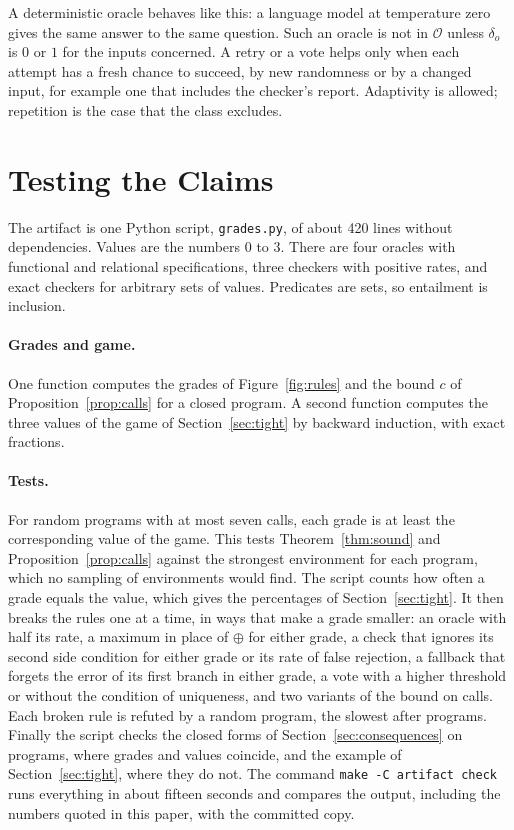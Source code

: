\documentclass[acmsmall,nonacm,screen]{acmart}
\newcommand{\cO}{\mathcal{O}}
\begin{document}
A deterministic oracle behaves like this: a language model at temperature zero gives the
same answer to the same question. Such an oracle is not in $\cO$ unless $\delta_o$ is $0$ or
$1$ for the inputs concerned. A retry or a vote helps only when each attempt has a fresh
chance to succeed, by new randomness or by a changed input, for example one that includes
the checker's report. Adaptivity is allowed; repetition is the case that the class excludes.

\section{Testing the Claims}
\label{sec:tests}

The artifact is one Python script, \texttt{grades.py}, of about 420 lines without
dependencies. Values are the numbers $0$ to $3$. There are four oracles with functional and
relational specifications, three checkers with positive rates, and exact checkers for
arbitrary sets of values. Predicates are sets, so entailment is inclusion.

\paragraph{Grades and game.} One function computes the grades of Figure~\ref{fig:rules} and
the bound $c$ of Proposition~\ref{prop:calls} for a closed program. A second function computes
the three values of the game of Section~\ref{sec:tight} by backward induction, with exact
fractions.

\paragraph{Tests.} For \exPrograms{} random programs with at most seven calls, each grade is
at least the corresponding value of the game. This tests Theorem~\ref{thm:sound} and
Proposition~\ref{prop:calls} against the strongest environment for each program, which no
sampling of environments would find. The script counts how often a grade equals the value,
which gives the percentages of Section~\ref{sec:tight}. It then breaks the rules one at a
time, in \exRules{} ways that make a grade smaller: an oracle with half its rate, a maximum
in place of $\oplus$ for either grade, a check that ignores its second side condition for
either grade or its rate of false rejection, a fallback that forgets the error of its first
branch in either grade, a vote with a higher threshold or without the condition of
uniqueness, and two variants of the bound on calls. Each broken rule is refuted by a random program, the slowest after \exSlowest{}
programs. Finally the script checks the closed forms of Section~\ref{sec:consequences} on
\exCases{} programs, where grades and values coincide, and the example of
Section~\ref{sec:tight}, where they do not. The command \texttt{make -C artifact check} runs
everything in about fifteen seconds and compares the output, including the numbers quoted in
this paper, with the committed copy.
\end{document}
